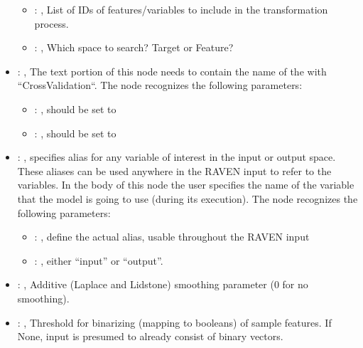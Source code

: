 \begin{itemize}
\begin{itemize}
        \item {}: , 
          List of IDs of features/variables to include in the transformation process.

        \item {}: , 
          Which space to search? Target or Feature?
      \end{itemize}

    \item {}: , 
      The text portion of this node needs to contain the name of the  with
               ``CrossValidation``.
      The  node recognizes the following parameters:
        \begin{itemize}
          \item {}: , 
            should be set to 
          \item {}: , 
            should be set to 
      \end{itemize}

    \item {}: , 
      specifies alias for         any variable of interest in the input or output space. These
      aliases can be used anywhere in the RAVEN input to         refer to the variables. In the body
      of this node the user specifies the name of the variable that the model is going to use
      (during its execution).
      The  node recognizes the following parameters:
        \begin{itemize}
          \item {}: , 
            define the actual alias, usable throughout the RAVEN input
          \item {}: , 
            either ``input'' or ``output''.
      \end{itemize}

    \item {}: , 
      Additive (Laplace and Lidstone) smoothing parameter (0 for no smoothing).

    \item {}: , 
      Threshold for binarizing (mapping to booleans) of sample features. If None,
      input is presumed to already consist of binary vectors.


\end{itemize}
